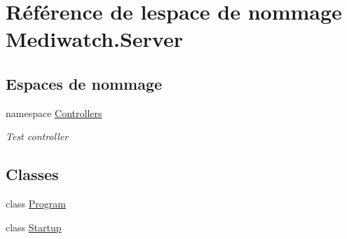 \hypertarget{namespace_mediwatch_1_1_server}{}\section{Référence de l\textquotesingle{}espace de nommage Mediwatch.\+Server}
\label{namespace_mediwatch_1_1_server}
\subsection*{Espaces de nommage}
\begin{DoxyCompactItemize}
\item 
namespace \hyperlink{namespace_mediwatch_1_1_server_1_1_controllers}{Controllers}
\begin{DoxyCompactList}\small\item\em Test controller \end{DoxyCompactList}\end{DoxyCompactItemize}
\subsection*{Classes}
\begin{DoxyCompactItemize}
\item 
class \hyperlink{class_mediwatch_1_1_server_1_1_program}{Program}
\item 
class \hyperlink{class_mediwatch_1_1_server_1_1_startup}{Startup}
\end{DoxyCompactItemize}
